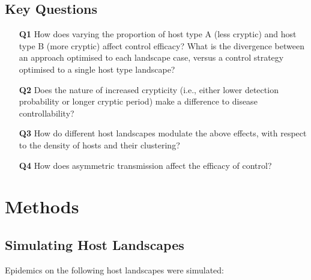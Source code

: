 \documentclass[11pt,letterpaper]{article}
\begin{document}
\begin{framed}
	\subsection*{ \label{question} Key Questions}
\begin{itemize}
	
   \item[\textbf{Q1}] \label{Q1} How does varying the proportion of host type A (less cryptic) and host type B (more cryptic) affect control efficacy? What is the divergence between an approach optimised to each landscape case, versus a control strategy optimised to a single host type landscape? 
     \item[\textbf{Q2}] \label{Q2} {Does the nature of increased crypticity (i.e., either lower detection probability or longer cryptic period) make a difference to disease controllability? }
    \item[\textbf{Q3}] \label{Q4} {How do different host landscapes modulate the above effects, with respect to the density of hosts and their clustering?}
    \item[\textbf{Q4}] \label{Q5} {How does asymmetric transmission affect the efficacy of control?}
\end{itemize}
\end{framed}

\FloatBarrier
\section*{Methods}
\FloatBarrier
\subsection*{Simulating Host Landscapes}

Epidemics on the following host landscapes were simulated:
\end{document}
